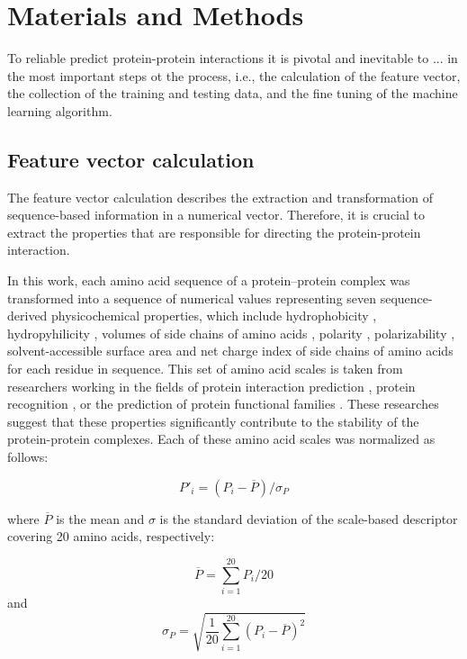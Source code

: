 \documentclass[preprint,3p,times,twocolumn]{elsarticle}
\begin{document}

\section{Materials and Methods}
To reliable predict protein-protein interactions it is pivotal and inevitable to ... in the most important steps ot the process, i.e., the calculation of the feature vector, the collection of the training and testing data, and the fine tuning of the machine learning algorithm.

\subsection{Feature vector calculation}
The feature vector calculation describes the extraction and transformation of sequence-based information in a numerical vector. Therefore, it is crucial to extract the properties that are responsible for directing the protein-protein interaction.

In this work, each amino acid sequence of a protein–protein complex was transformed into a sequence of numerical values representing seven sequence-derived physicochemical properties, which include hydrophobicity \cite{Eisenberg:1984}, hydropyhilicity \cite{Hopp:1981}, volumes of side chains of amino acids \cite{Krigbaum:1979}, polarity \cite{Grantham:1974}, polarizability \cite{Charton:1982}, solvent-accessible
surface area \cite{Rose:1985} and net charge index of side chains of amino acids \cite{Zhou:2006} for each residue in sequence. This set of amino acid scales is taken from researchers working in the fields of protein interaction prediction \cite{Bock:2001} \cite{Bock:2003}, protein recognition \cite{Ding:2001}, or the prediction of protein functional families \cite{Cai:2003}. These researches suggest that these properties significantly contribute to the stability of the protein-protein complexes. Each of these amino acid scales was normalized as follows:

\begin{equation}
P'_{i} = (P_i - \overline{P}) / \sigma_P
\end{equation}

where $\overline{P}$ is the mean and $\sigma$ is the standard deviation of the scale-based descriptor covering 20 amino acids, respectively:

\begin{equation}
\overline{P} = \sum^{20}_{i=1}P_i / 20
\end{equation}
 and 
\begin{equation}
\sigma_P = \sqrt{\frac{1}{20} \sum^{20}_{i=1}(P_i - \overline{P})^2}
\end{equation}
\end{document}

